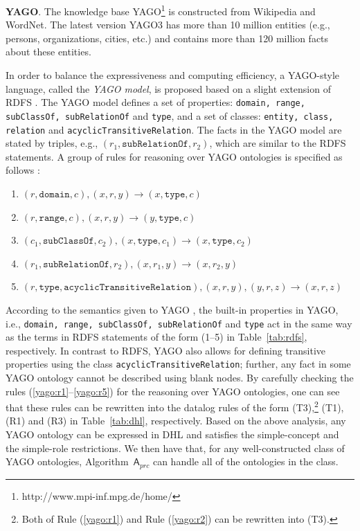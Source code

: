 \textbf{YAGO}. The knowledge base YAGO\footnote{http://www.mpi-inf.mpg.de/home/}
is constructed from Wikipedia and WordNet. The latest version
YAGO3 \cite{MahdisoltaniBS15} has more than 10 million entities
(e.g., persons, organizations, cities, etc.)
and contains more than 120 million facts about these entities.

In order to balance the expressiveness and computing efficiency,
a YAGO-style language, called the \emph{YAGO model}, is proposed based on
a slight extension of RDFS \cite{SuchanekKW08}. The YAGO model defines
a set of properties: \texttt{domain, range, subClassOf, subRelationOf} and \texttt{type},
and a set of classes: \texttt{entity, class, relation} and \texttt{acyclicTransitiveRelation}.
The facts in the YAGO model are stated by triples, e.g., $(r_1,
\texttt{subRelationOf}, r_2)$,
which are similar to the RDFS statements.
A group of rules for reasoning over YAGO ontologies
is specified as follows \cite{SuchanekKW08}:
\begin{enumerate}[leftmargin=8ex,label=(\arabic*),ref=\arabic*]
  \item $(r,\texttt{domain}, c), (x, r, y) \rightarrow (x,
    \texttt{type}, c)$\label{yago:r1}
  \item $(r,\texttt{range}, c), (x, r, y) \rightarrow (y,
    \texttt{type}, c)$\label{yago:r2}
  \item $(c_1, \texttt{subClassOf}, c_2), (x, \texttt{type}, c_1)
    \rightarrow (x, \texttt{type}, c_2)$\label{yago:r3}
  \item $(r_1, \texttt{subRelationOf}, r_2), (x, r_1, y) \rightarrow
    (x, r_2, y)$\label{yago:r4}
  \item $(r, \texttt{type}, \texttt{acyclicTransitiveRelation}), (x,
    r, y), (y, r, z) \rightarrow (x, r, z)$\label{yago:r5}
\end{enumerate}

According to the semantics given to YAGO \cite{SuchanekKW08}, the built-in properties in YAGO,
i.e., \texttt{domain, range, subClassOf, subRelationOf} and \texttt{type} act in the same
way as the terms in RDFS statements of the form (1--5) in Table~\ref{tab:rdfs}, respectively.
In contrast to RDFS, YAGO also allows for defining
transitive properties using the
class \texttt{acyclicTransitiveRelation}; further, any fact in some YAGO ontology cannot be
described using blank nodes. By carefully checking the rules (\ref{yago:r1}--\ref{yago:r5}) for the reasoning over YAGO ontologies,
one can see that these rules can be rewritten into the datalog rules
of the form (T3),\footnote{Both of Rule (\ref{yago:r1}) and
Rule (\ref{yago:r2}) can be rewritten into (T3).} (T1), (R1) and (R3) in Table~\ref{tab:dhl}, respectively.
Based on the above analysis, any YAGO ontology can be expressed in DHL
and satisfies the simple-concept and the simple-role restrictions. We then have that,
for any well-constructed class of YAGO ontologies,
Algorithm~$\mathsf{A}_{prc}$
can handle all of the ontologies in the class.

